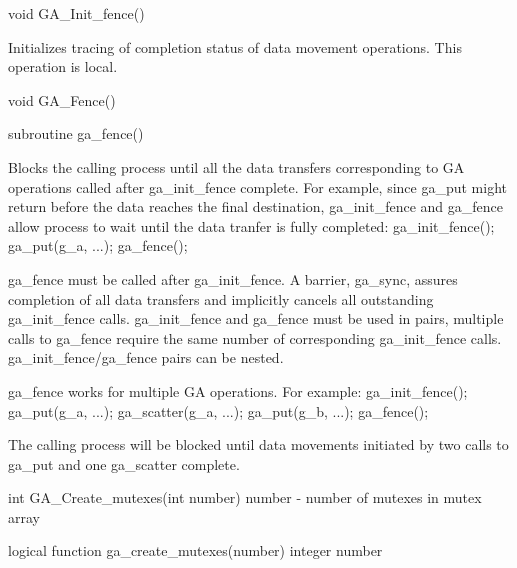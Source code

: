 \documentclass[12pt]{article}
\begin{document}

\begin{capi}
void GA_Init_fence()
\end{capi}

\begin{desc}

Initializes tracing of completion status of data movement operations.
This operation is local.
\end{desc}


\begin{capi}
void GA_Fence()
\end{capi}
\begin{fapi}
subroutine ga_fence()
\end{fapi}

\begin{desc}

Blocks the calling process until all the data transfers corresponding to GA operations called after ga_init_fence complete. For example, since ga_put might return before the data reaches the final destination, ga_init_fence and ga_fence allow process to wait until the data tranfer is fully completed:
        ga_init_fence();
        ga_put(g_a, ...);
        ga_fence();

ga_fence must be called after ga_init_fence. A barrier, ga_sync, assures completion of all data transfers and implicitly cancels all outstanding ga_init_fence calls. ga_init_fence and ga_fence must be used in pairs, multiple calls to ga_fence require the same number of corresponding ga_init_fence calls. ga_init_fence/ga_fence pairs can be nested.

ga_fence works for multiple GA operations. For example:
        ga_init_fence();
        ga_put(g_a, ...);
        ga_scatter(g_a, ...);
        ga_put(g_b, ...);
        ga_fence();

The calling process will be blocked until data movements initiated by two calls to ga_put and one ga_scatter complete.
\end{desc}


\begin{capi}
int GA_Create_mutexes(int number)
   number  - number of mutexes in mutex array    \access{[input]} 
\end{capi}
\begin{fapi}
logical function ga_create_mutexes(number)
   integer number              \access{[input]} 
\end{fapi}
\end{document}
